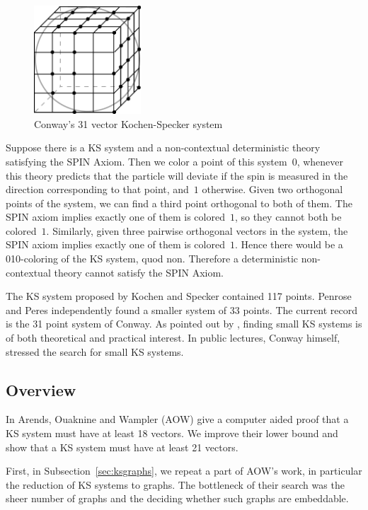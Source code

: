 \documentclass[adraft,copyright,creativecommons]{eptcs}
\theoremstyle{definition}
\theoremstyle{remark}
\begin{document}
\begin{figure}
\begin{center}
\includegraphics[width=40mm]{../graphs/ks31.pdf}
\end{center}
\caption{Conway's 31 vector Kochen-Specker system
\label{fig:conway31}}
\end{figure}
Suppose there is a KS system and a non-contextual deterministic theory satisfying
the SPIN Axiom.
Then we color a point of this system~$0$,
whenever this theory predicts that the particle will deviate
if the spin is measured in the direction corresponding to that
point, and~$1$ otherwise.
Given two orthogonal points of the system,
we can find a third point orthogonal to both of them.
The SPIN axiom implies exactly one of them is colored~$1$, so they
cannot both be colored~$1$.
Similarly, given three pairwise orthogonal vectors in the system,
the SPIN axiom implies exactly one of them is colored~$1$.
Hence there would be a 010-coloring of the KS system, quod non.
Therefore a deterministic non-contextual theory cannot satisfy the
SPIN Axiom.

The KS system proposed by Kochen and Specker contained 117 points\cite{ks}.
Penrose and Peres\cite{peres} independently found a smaller system of 33 points.
The current record is the 31 point system of Conway\cite[p.~197]{qtcm}.
As pointed out by \cite{c00,aow11}, finding small KS systems
is of both theoretical and practical interest.
In public lectures, Conway himself, stressed the search for small KS
systems.\cite{OC}

\subsection{Overview}
In \cite{aow11} Arends, Ouaknine and Wampler (AOW) give a computer aided proof
that a KS system must have at least 18 vectors.  We improve their lower bound
and show that a KS system must have at least 21 vectors.

First, in Subsection~\ref{sec:ksgraphs},
we repeat a part of AOW's work, in particular the reduction of
KS systems to graphs.
The bottleneck of their search was the sheer number of graphs
and the deciding whether such graphs are embeddable.
\end{document}
